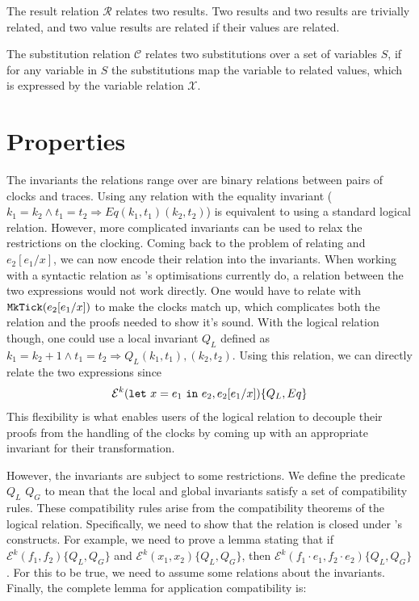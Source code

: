 The result relation $\mathcal{R}$ relates two \ThunkLang{} results. Two
 results and two  results are trivially related, and two
value results are related if their values are related.

The substitution relation $\mathcal{C}$ relates two substitutions over a set of
variables $S$, if for any variable in $S$ the substitutions map the variable to
related values, which is expressed by the variable relation $\mathcal{X}$.

\section{Properties}

The invariants the relations range over are binary relations between pairs of
clocks and traces. Using any relation with the equality invariant ($k_1 = k_2
\land t_1 = t_2 \Rightarrow Eq(k_1,t_1)(k_2, t_2)$) is equivalent to using a
standard logical relation. However, more complicated invariants can be used to
relax the restrictions on the clocking. Coming back to the problem of relating
 and $e_2[e_1/x]$, we can now encode their
relation into the invariants. When working with a syntactic relation as
\ThunkLang{}'s optimisations currently do, a relation between the two
expressions would not work directly. One would have to relate  with $\texttt{MkTick}(e_2[e_1/x])$ to make the clocks match up,
which complicates both the relation and the proofs needed to show it's sound.
With the logical relation though, one could use a local invariant $Q_L$ defined
as $k_1 = k_2 + 1 \land t_1 = t_2 \Rightarrow Q_L(k_1,t_1),(k_2,t_2)$. Using
this relation, we can directly relate the two expressions since
\[\mathcal{E}^k(\lit{let}\ x = e_1\ \lit{in}\ e_2, e_2[e_1/x])\{Q_L,Eq\}\] This
flexibility is what enables users of the logical relation to decouple their
proofs from the handling of the clocks by coming up with an appropriate
invariant for their transformation.

However, the invariants are subject to some restrictions. We define the
predicate  $Q_L$ $Q_G$ to mean that the local and global invariants
satisfy a set of compatibility rules. These compatibility rules arise from the
compatibility theorems of the logical relation. Specifically, we need to show
that the relation is closed under \ThunkLang{}'s constructs. For example, we
need to prove a lemma stating that if $\mathcal{E}^k(f_1,f_2)\{Q_L,Q_G\}$ and
$\mathcal{E}^k(x_1,x_2)\{Q_L,Q_G\}$, then $\mathcal{E}^k(f_1 \cdot e_1, f_2
\cdot e_2)\{Q_L,Q_G\}$. For this to be true, we need to assume some relations
about the invariants. Finally, the complete lemma for application compatibility
is:

